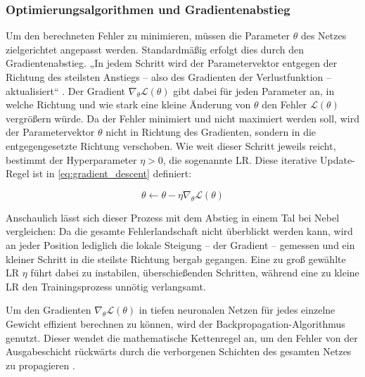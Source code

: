 \subsubsection{Optimierungsalgorithmen und Gradientenabstieg}

Um den berechneten Fehler zu minimieren, müssen die Parameter $\theta$ des Netzes zielgerichtet angepasst werden. 
Standardmäßig erfolgt dies durch den Gradientenabstieg. 
„In jedem Schritt wird der Parametervektor entgegen der Richtung des steilsten Anstiegs -- also des Gradienten der Verlustfunktion -- aktualisiert“ \cite[S.~240]{chap2_Bis06}. 
Der Gradient $\nabla_\theta \mathcal{L}(\theta)$ gibt dabei für jeden Parameter an, in welche Richtung und wie stark eine kleine Änderung von $\theta$ den Fehler $\mathcal{L}(\theta)$ vergrößern würde. 
Da der Fehler minimiert und nicht maximiert werden soll, wird der Parametervektor $\theta$ nicht in Richtung des Gradienten, sondern in die entgegengesetzte Richtung verschoben. 
Wie weit dieser Schritt jeweils reicht, bestimmt der Hyperparameter $\eta > 0$, die sogenannte \gls{LR}. 
Diese iterative Update-Regel ist in \autoref{eq:gradient_descent} definiert:

\begin{equation} \label{eq:gradient_descent}
\theta \leftarrow \theta - \eta \nabla_\theta \mathcal{L}(\theta)
\end{equation}

Anschaulich lässt sich dieser Prozess mit dem Abstieg in einem Tal bei Nebel vergleichen: Da die gesamte Fehlerlandschaft nicht überblickt werden kann, wird an jeder Position lediglich die lokale Steigung -- der Gradient -- gemessen und ein kleiner Schritt in die steilste Richtung bergab gegangen. 
Eine zu groß gewählte \gls{LR} $\eta$ führt dabei zu instabilen, überschießenden Schritten, während eine zu kleine \gls{LR} den Trainingsprozess unnötig verlangsamt.

Um den Gradienten $\nabla_\theta \mathcal{L}(\theta)$ in tiefen neuronalen Netzen für jedes einzelne Gewicht effizient berechnen zu können, wird der Backpropagation-Algorithmus genutzt. 
Dieser wendet die mathematische Kettenregel an, um den Fehler von der Ausgabeschicht rückwärts durch die verborgenen Schichten des gesamten Netzes zu propagieren \cite[vgl.~S.~204f.]{chap2_Goo16}.

